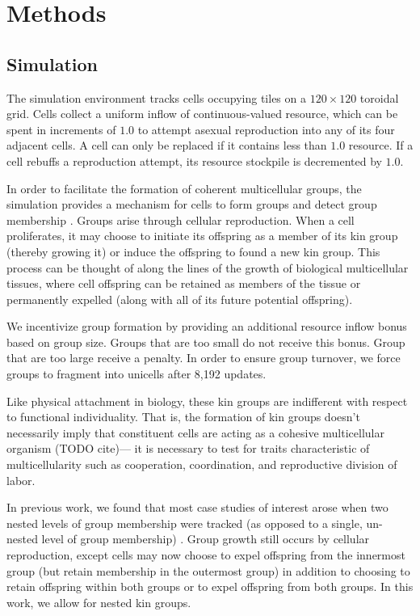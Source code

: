 \section{Methods}

\subsection{Simulation}

The simulation environment tracks cells occupying tiles on a $120\times120$ toroidal grid.
Cells collect a uniform inflow of continuous-valued resource, which can be spent in increments of $1.0$ to attempt asexual reproduction into any of its four adjacent cells.
A cell can only be replaced if it contains less than $1.0$ resource.
If a cell rebuffs a reproduction attempt, its resource stockpile is decremented by $1.0$.  

In order to facilitate the formation of coherent multicellular groups, the simulation provides a mechanism for cells to form groups and detect group membership \cite{moreno2019toward}.
Groups arise through cellular reproduction.
When a cell proliferates, it may choose to initiate its offspring as a member of its kin group (thereby growing it) or induce the offspring to found a new kin group.
This process can be thought of along the lines of 
the growth of biological multicellular tissues, where cell offspring can be retained as members of the tissue or permanently expelled (along with all of its future potential offspring).

We incentivize group formation by providing an additional resource inflow bonus based on group size.
Groups that are too small do not receive this bonus.
Group that are too large receive a penalty.
In order to ensure group turnover, we force groups to fragment into unicells after 8,192 updates.

Like physical attachment in biology, these kin groups are indifferent with respect to functional individuality.
That is, the formation of kin groups doesn't necessarily imply that constituent cells are acting as a cohesive multicellular organism (TODO cite)--- it is necessary to test for traits characteristic of multicellularity such as cooperation, coordination, and reproductive division of labor.

In previous work, we found that most case studies of interest arose when two nested levels of group membership were tracked
(as opposed to a single, un-nested level of group membership) \cite{moreno2021exploring}.
Group growth still occurs by cellular reproduction, except cells may now choose to expel offspring from the innermost group (but retain membership in the outermost group) in addition to choosing to retain offspring within both groups or to expel offspring from both groups.
In this work, we allow for nested kin groups.


